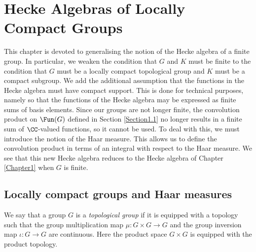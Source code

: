 \documentclass[11pt]{amsart}
\theoremstyle{remark}
\begin{document}

\newpage
\section{Hecke Algebras of Locally Compact Groups}\label{Chapter4}
This chapter is devoted to generalising the notion of the Hecke algebra of a finite group.
In particular, we weaken the condition that $G$ and $K$ must be finite to the condition that $G$ must be a locally compact topological group and $K$ must be a compact subgroup.
We add the additional assumption that the functions in the Hecke algebra must have compact support.
This is done for technical purposes, namely so that the functions of the Hecke algebra may be expressed as finite sums of basis elements.
Since our groups are not longer finite, the convolution product on $\Fun(G)$ defined in Section \ref{Section1.1} no longer results in a finite sum of $\CC$-valued functions, so it cannot be used.
To deal with this, we must introduce the notion of the Haar measure.
This allows us to define the convolution product in terms of an integral with respect to the Haar measure.
We see that this new Hecke algebra reduces to the Hecke algebra of Chapter \ref{Chapter1} when $G$ is finite.


\subsection{Locally compact groups and Haar measures}\label{Section4.1}
We say that a group $G$ is a \emph{topological group} if it is equipped with a topology such that the group multiplication map $\mu\colon G\times G\to G$ and the group inversion map $\iota\colon G\to G$ are continuous.
Here the product space $G\times G$ is equipped with the product topology.
\end{document}
